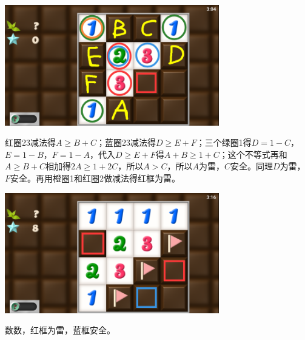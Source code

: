 \subsection{} %
\begin{center}
    \includegraphics[width=0.7\textwidth]{puzzle/154-1.png}
\end{center}
红圈23减法得$A\ge B+C$；蓝圈23减法得$D\ge E+F$；三个绿圈1得$D=1-C$，$E=1-B$，$F=1-A$，代入$D\ge E+F$得$A+B\ge 1+C$；这个不等式再和$A\ge B+C$相加得$2A\ge 1+2C$，所以$A>C$，所以$A$为雷，$C$安全。同理$D$为雷，$F$安全。再用橙圈1和红圈2做减法得红框为雷。
\begin{center}
    \includegraphics[width=0.7\textwidth]{puzzle/154-2.png}
\end{center}
数数，红框为雷，蓝框安全。

